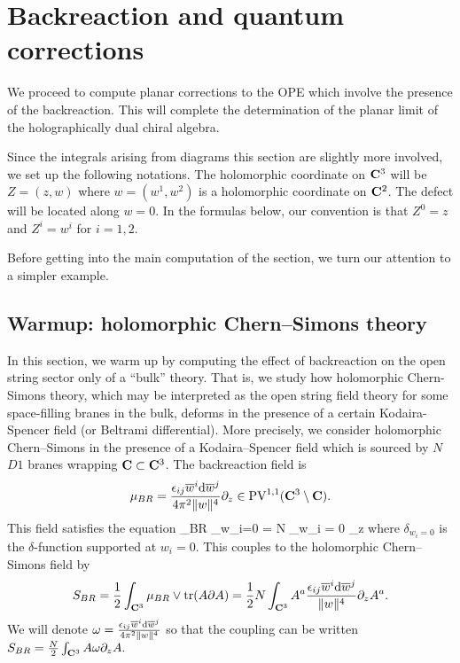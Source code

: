 \documentclass[../main.tex]{subfiles}
\begin{document}
\section{Backreaction and quantum corrections}
\label{sec:br}

We proceed to compute planar corrections to the OPE which involve the presence of the backreaction. 
This will complete the determination of the planar limit of the holographically dual chiral algebra.

Since the integrals arising from diagrams this section are slightly more involved, we set up the following notations.
The holomorphic coordinate on $\mathbf{C}^3$ will be $Z = (z , w)$ where $w = (w^1,w^2)$ is a holomorphic coordinate on $\mathbf{C}^2$.
The defect will be located along $w = 0$.
In the formulas below, our convention is that $Z^0 = z$ and $Z^i = w^i$ for $i=1,2$.

Before getting into the main computation of the section, we turn our attention to a simpler example.

\subsection{Warmup: holomorphic Chern--Simons theory}

In this section, we warm up by computing the effect of backreaction on the open string sector only of a ``bulk'' theory. That is, we study how holomorphic Chern-Simons theory, which may be interpreted as the open string field theory for some space-filling branes in the bulk, deforms in the presence of a certain Kodaira-Spencer field (or Beltrami differential). 
More precisely, we consider holomorphic Chern--Simons in the presence of a Kodaira--Spencer field which is sourced by $N$ $D1$ branes wrapping $\mathbf{C} \subset \mathbf{C}^3$. 
The backreaction field is 
\[
\mu_{BR} = \frac{{\epsilon}_{ij} \overline{w}^i \mathrm{d} \overline{w}^j}{4 \pi^2 \|w\|^4} \partial_z \in {\rm PV}^{1,1} (\mathbf{C}^3 \setminus \mathbf{C}) . 
\]
This field satisfies the equation
\beqn\label{eqn:csBR}
\dbar \mu_{BR} \wedge \Omega_{w_i=0} = N \delta_{w_i = 0} \del_z 
\eeqn
where $\delta_{w_i=0}$ is the $\delta$-function supported at $w_i=0$.
This couples to the holomorphic Chern--Simons field by 
\[
S_{BR} = \frac12 \int_{\mathbf{C}^3} \mu_{BR} \vee \operatorname{tr}(A \partial A) = \frac12 N \int_{\mathbf{C}^3} A^a \frac{{\epsilon}_{ij} \overline{w}^i \mathrm{d} \overline{w}^j}{\|w\|^4} \partial_z A^a .
\]
We will denote $\omega = \frac{{\epsilon}_{ij} \overline{w}^i \mathrm{d} \overline{w}^j}{4 \pi^2\|w\|^4}$ so that the coupling can be written $S_{BR} = \frac{N}{2}
\int_{\mathbf{C}^3} A \omega \partial_z A.$
\end{document}
